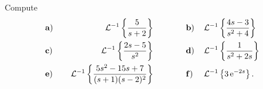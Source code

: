 {
Compute
\begin{align*}
&\text{\textbf a)}&&\, &\mathcal{L}^{-1}\left\{ \frac 5{s+2}\right\}&
\qquad\qquad\text{\textbf b)}& \, &\mathcal{L}^{-1}\left\{\frac {4s-3}{s^2+4}\right\}\\
&\text{\textbf c)}&&\, &\mathcal{L}^{-1}\left\{ \frac {2s-5}{s^2}\right\}&
\qquad\qquad\text{\textbf d)}& \, &\mathcal{L}^{-1}\left\{ \frac 1{s^2+2s}\right\}\\
&\text{\textbf e)}&&\, &\mathcal{L}^{-1}\left\{\frac {5s^2-15s+7}{(s+1)(s-2)^2}\right\}&
\qquad\qquad\text{\textbf f)}&\, &\mathcal{L}^{-1}\left\{3\operatorname{e}^{-2s}\right\}.
\end{align*}
}
